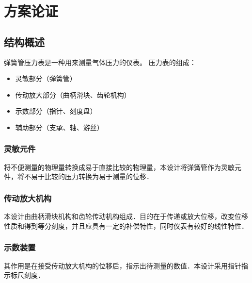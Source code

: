 \section{方案论证}
\subsection{结构概述}
弹簧管压力表是一种用来测量气体压力的仪表。
\newline
压力表的组成：
\begin{itemize}
    \item 灵敏部分（弹簧管）
    \item 传动放大部分（曲柄滑块、齿轮机构）
    \item 示数部分（指针、刻度盘）
    \item 辅助部分（支承、轴、游丝）
\end{itemize}
\subsubsection{灵敏元件}
将不便测量的物理量转换成易于直接比较的物理量，本设计将弹簧管作为灵敏元件，将不易于比较的压力转换为易于测量的位移．
\subsubsection{传动放大机构}
本设计由曲柄滑块机构和齿轮传动机构组成．目的在于传递或放大位移，改变位移性质和得到等分刻度，并且应具有一定的补偿特性，同时仪表有较好的线性特性．
\subsubsection{示数装置}
其作用是在接受传动放大机构的位移后，指示出待测量的数值．本设计采用指针指示标尺刻度．
